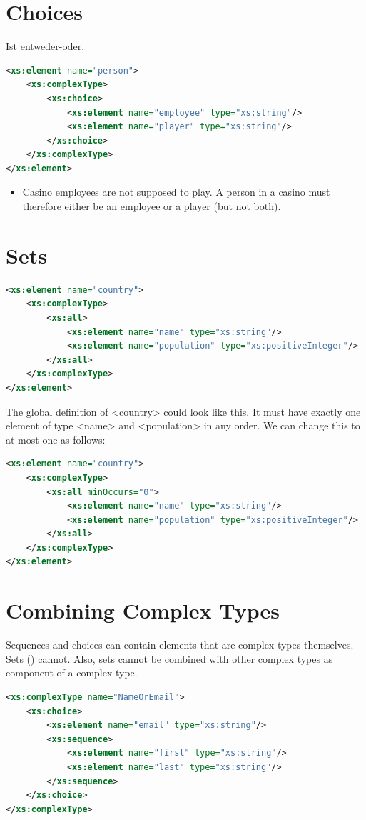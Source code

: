 \section{Choices}
Ist entweder-oder.
\begin{lstlisting}[language=XML, caption={Sequences with Global Definitions}]
<xs:element name="person">
	<xs:complexType>
		<xs:choice>
			<xs:element name="employee" type="xs:string"/>
			<xs:element name="player" type="xs:string"/>
		</xs:choice>
	</xs:complexType>
</xs:element>
\end{lstlisting}
\begin{itemize}
\item Casino employees are not supposed to play. A person in a casino must therefore either be an employee or a player (but not both).
\end{itemize}

\section{Sets}
\begin{lstlisting}[language=XML, caption={Sequences with Global Definitions}]
<xs:element name="country">
	<xs:complexType>
		<xs:all>
			<xs:element name="name" type="xs:string"/>
			<xs:element name="population" type="xs:positiveInteger"/>
		</xs:all> 
	</xs:complexType>
</xs:element>
\end{lstlisting}

The global definition of <country> could look like this. It must have exactly one element of type <name> and <population> in any order. We can change this to at most one as follows:

\begin{lstlisting}[language=XML, caption={Sequences with Global Definitions}]
<xs:element name="country">
	<xs:complexType>
		<xs:all minOccurs="0">
			<xs:element name="name" type="xs:string"/>
			<xs:element name="population" type="xs:positiveInteger"/>
		</xs:all>
	</xs:complexType>
</xs:element>
\end{lstlisting}


\section{Combining Complex Types}
Sequences and choices can contain elements that are complex types themselves. Sets () cannot. Also, sets cannot be combined
with other complex types as component of a complex type.
\begin{lstlisting}[language=XML, caption={Sequences with Global Definitions}]
<xs:complexType name="NameOrEmail">
	<xs:choice>
		<xs:element name="email" type="xs:string"/>
		<xs:sequence>
			<xs:element name="first" type="xs:string"/>
			<xs:element name="last" type="xs:string"/>
		</xs:sequence>
	</xs:choice>
</xs:complexType>
\end{lstlisting}

